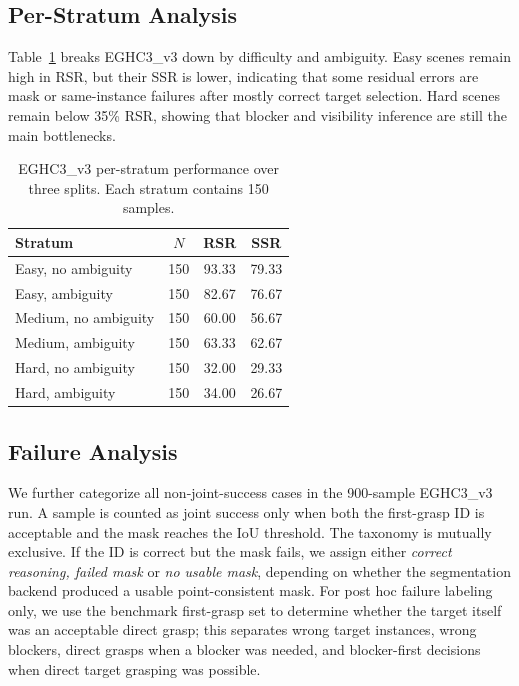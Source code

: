 \subsection{Per-Stratum Analysis}

Table~\ref{tab:strata} breaks EGHC3\_v3 down by difficulty and ambiguity. Easy scenes remain high in RSR, but their SSR is lower, indicating that some residual errors are mask or same-instance failures after mostly correct target selection. Hard scenes remain below 35\% RSR, showing that blocker and visibility inference are still the main bottlenecks.

\begin{table}[t]
\centering
\caption{EGHC3\_v3 per-stratum performance over three splits. Each stratum contains 150 samples.}
\label{tab:strata}
\small
\begin{tabular}{lccc}
\toprule
Stratum & $N$ & RSR & SSR \\
\midrule
Easy, no ambiguity & 150 & 93.33 & 79.33 \\
Easy, ambiguity & 150 & 82.67 & 76.67 \\
Medium, no ambiguity & 150 & 60.00 & 56.67 \\
Medium, ambiguity & 150 & 63.33 & 62.67 \\
Hard, no ambiguity & 150 & 32.00 & 29.33 \\
Hard, ambiguity & 150 & 34.00 & 26.67 \\
\bottomrule
\end{tabular}
\end{table}

\subsection{Failure Analysis}

We further categorize all non-joint-success cases in the 900-sample EGHC3\_v3 run. A sample is counted as joint success only when both the first-grasp ID is acceptable and the mask reaches the IoU threshold. The taxonomy is mutually exclusive. If the ID is correct but the mask fails, we assign either \emph{correct reasoning, failed mask} or \emph{no usable mask}, depending on whether the segmentation backend produced a usable point-consistent mask. For post hoc failure labeling only, we use the benchmark first-grasp set to determine whether the target itself was an acceptable direct grasp; this separates wrong target instances, wrong blockers, direct grasps when a blocker was needed, and blocker-first decisions when direct target grasping was possible.

